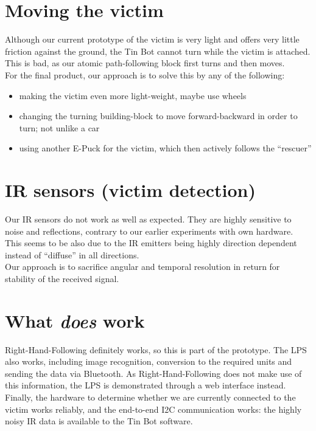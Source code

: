 \documentclass[a4paper,parskip,headheight=38pt]{scrartcl} %
\begin{document}
\section{Moving the victim} %

Although our current prototype of the victim is very light and offers
very little friction against the ground, the Tin Bot cannot turn while
the victim is attached.  This is bad, as our atomic path-following
block first turns and then moves.
 \\
For the final product, our approach is to solve this by any of the
following:
\begin{itemize}
    \item making the victim even more light-weight, maybe use wheels
    \item changing the turning building-block to move forward-backward
    in order to turn; not unlike a car
    \item using another E-Puck for the victim, which then actively
    follows the \enquote{rescuer}
\end{itemize}

\section{IR sensors (victim detection)}

Our IR sensors do not work as well as expected.  They are highly
sensitive to noise and reflections, contrary to our earlier experiments
with own hardware.
 \\
This seems to be also due to the IR emitters being highly direction
dependent instead of \enquote{diffuse} in all directions.
 \\
Our approach is to sacrifice angular and temporal resolution in return
for stability of the received signal.

\section{What \emph{does} work}

Right-Hand-Following definitely works, so this is part of the
prototype.  The LPS also works, including image recognition, conversion
to the required units and sending the data via Bluetooth.  As
Right-Hand-Following does not make use of this information, the LPS is
demonstrated through a web interface instead.  Finally, the hardware to
determine whether we are currently connected to the victim works
reliably, and the end-to-end I2C communication works: the highly
noisy IR data is available to the Tin Bot software.
\end{document}
